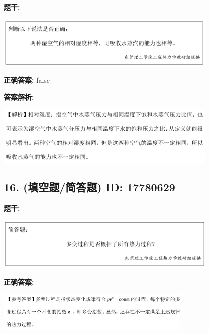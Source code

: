 \documentclass[12pt]{article}
\begin{document}
\textbf{题干:}


\begin{center}\includegraphics[width=0.8\textwidth, height=0.25\textheight, keepaspectratio]{question_15_17780639/title_img_1.png}\end{center}

\textbf{正确答案:}
false

\textbf{答案解析:}


\begin{center}\includegraphics[width=0.8\textwidth, height=0.25\textheight, keepaspectratio]{question_15_17780639/correct_replay_img_1.png}\end{center}

\vspace{0.5em}\hrulefill\vspace{1em}

\subsection*{16. (填空题/简答题) \small ID: 17780629}

\textbf{题干:}


\begin{center}\includegraphics[width=0.8\textwidth, height=0.25\textheight, keepaspectratio]{question_16_17780629/title_img_1.png}\end{center}

\textbf{正确答案:}

\begin{center}\includegraphics[width=0.7\textwidth, height=0.2\textheight, keepaspectratio]{question_16_17780629/correct_answer_1_img_1.png}\end{center}
\end{document}
